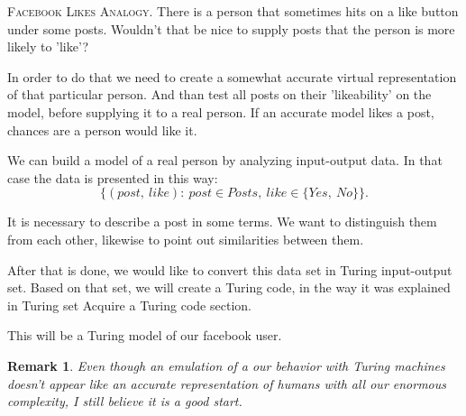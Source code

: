 \documentclass[12pt]{article}
\newcommand\tab[1][-1em]{\hspace*{#1}}
\newtheorem*{remark}{Remark}
\begin{document}
\vspace{5mm}
\begin{addmargin}[3em]{3em}
\tab
\textsc{Facebook Likes Analogy.} There is a person that sometimes hits on a like button under some posts. Wouldn't that be nice to supply posts that the person is more likely to 'like'?

In order to do that we need to create a somewhat accurate virtual representation of that particular person. And than test all posts on their 'likeability' on the model, before supplying it to a real person. If an accurate model likes a post, chances are a person would like it.

We can build a model of a real person by analyzing input-output data. In that case the data is presented in this way: $$\{(post,\ like):\ post\in Posts,\ like\in\{Yes,\ No\}\}.$$

It is necessary to describe a post in some terms. We want to distinguish them from each other, likewise to point out similarities between them.

After that is done, we would like to convert this data set in Turing input-output set. Based on that set, we will create a Turing code, in the way it was explained in Turing set \textsf{Acquire a Turing code
} section.

This will be a Turing model of our facebook user. 
\end{addmargin}

\begin{remark}
Even though an emulation of a our behavior with Turing machines doesn't appear like an accurate representation of humans with all our enormous complexity, I still believe it is a good start.
\end{remark}


\end{document}
